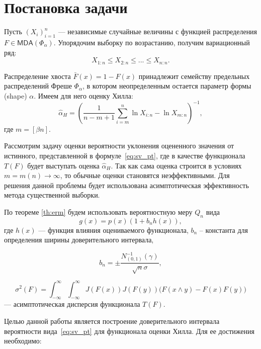 \documentclass[12pt, specialist, subf, substylefile = spbu.rtx]{disser}
\newcommand{\MDA}{\mathsf{MDA}}
\begin{document}
\section{Постановка задачи}

Пусть $(X_i)_{i=1}^n$ --- независимые случайные величины с функцией распределения $F \in \MDA(\Phi_\alpha)$. Упорядочим выборку по возрастанию, получим вариационный ряд:
$$
X_{1:n} \le X_{2:n} \le ... \le X_{n:n}.
$$

Распределение хвоста $\bar{F}(x)=1-F(x)$ принадлежит семейству предельных распределений Фреше $\Phi_\alpha$, в котором неопределенным остается параметр формы (shape) $\alpha$. Имеем для него оценку Хилла:
\begin{equation}\label{eq:hill_est}
\hat{\alpha}_H=
\left(\frac{1}{n-m+1} \sum\limits_{i=m}^n \ln X_{i:n}-\ln X_{m:n} \right)^{-1},
\end{equation}
где $m=[\beta n]$.

Рассмотрим задачу оценки вероятности уклонения оцененного значения от истинного, представленной в формуле~\eqref{eq:sv_pt}, где в качестве функционала $T(F)$ будет выступать оценка $\hat{\alpha}_H$. Так как сама оценка строится в условиях $m=m(n) \to \infty$, то обычные оценки становятся неэффективными. Для решения данной проблемы будет использована асимптотическая эффективность метода существенной выборки.

По теореме \ref{th:erm} будем использовать вероятностную меру $Q_n$ вида
\begin{equation}\label{eq:g_common}
g(x)=p(x)(1+b_nh(x)),
\end{equation}
где $h(x)$ --- функция влияния оцениваемого функционала, $b_n$ -- константа для определения ширины доверительного интервала, 

\begin{equation}\label{eq:bn}
b_n = \pm\frac{N_{(0,1)}^{-1}(\gamma)}{\sqrt{n}\sigma},
\end{equation}

\begin{equation}\label{eq:asymdisp}
\sigma^2(F)= \int_{-\infty}^\infty \int_{-\infty}^\infty J(F(x)) J(F(y))\big( F(x \wedge y)-F(x)F(y)\big)
\end{equation}
--- асимптотическая дисперсия функционала $T(F)$.

Целью данной работы является построение доверительного интервала вероятности вида~\eqref{eq:sv_pt} для функционала оценки Хилла. Для ее достижения необходимо:
\end{document}
